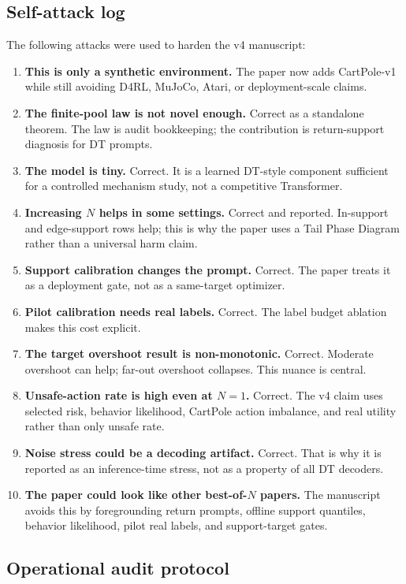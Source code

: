 \subsection{Self-attack log}

The following attacks were used to harden the v4 manuscript:
\begin{enumerate}
  \item \textbf{This is only a synthetic environment.} The paper now adds CartPole-v1 while still avoiding D4RL, MuJoCo, Atari, or deployment-scale claims.
  \item \textbf{The finite-pool law is not novel enough.} Correct as a standalone theorem. The law is audit bookkeeping; the contribution is return-support diagnosis for DT prompts.
  \item \textbf{The model is tiny.} Correct. It is a learned DT-style component sufficient for a controlled mechanism study, not a competitive Transformer.
  \item \textbf{Increasing $N$ helps in some settings.} Correct and reported. In-support and edge-support rows help; this is why the paper uses a Tail Phase Diagram rather than a universal harm claim.
  \item \textbf{Support calibration changes the prompt.} Correct. The paper treats it as a deployment gate, not as a same-target optimizer.
  \item \textbf{Pilot calibration needs real labels.} Correct. The label budget ablation makes this cost explicit.
  \item \textbf{The target overshoot result is non-monotonic.} Correct. Moderate overshoot can help; far-out overshoot collapses. This nuance is central.
  \item \textbf{Unsafe-action rate is high even at $N=1$.} Correct. The v4 claim uses selected risk, behavior likelihood, CartPole action imbalance, and real utility rather than only unsafe rate.
  \item \textbf{Noise stress could be a decoding artifact.} Correct. That is why it is reported as an inference-time stress, not as a property of all DT decoders.
  \item \textbf{The paper could look like other best-of-$N$ papers.} The manuscript avoids this by foregrounding return prompts, offline support quantiles, behavior likelihood, pilot real labels, and support-target gates.
\end{enumerate}

\subsection{Operational audit protocol}

